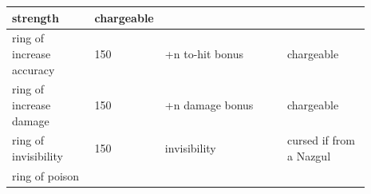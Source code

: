 \begin{longtable}{|>{\RaggedRight}p{0.23487\linewidth}|>{\RaggedRight}p{0.07372\linewidth}|>{\RaggedRight}p{0.34225\linewidth}|>{\RaggedRight}p{0.23487\linewidth}|}
strength\footnotemark[69]&\hspace*{0pt}\ignorespaces{}\hspace*{0pt}chargeable\\ \hline \hspace*{0pt}\ignorespaces{}\hspace*{0pt}ring of increase accuracy\footnotemark[70]&\hspace*{0pt}\ignorespaces{}\hspace*{0pt}150&\hspace*{0pt}\ignorespaces{}\hspace*{0pt}+n to-{}hit bonus&\hspace*{0pt}\ignorespaces{}\hspace*{0pt}chargeable\\ \hline \hspace*{0pt}\ignorespaces{}\hspace*{0pt}ring of increase damage\footnotemark[71]&\hspace*{0pt}\ignorespaces{}\hspace*{0pt}150&\hspace*{0pt}\ignorespaces{}\hspace*{0pt}+n damage bonus&\hspace*{0pt}\ignorespaces{}\hspace*{0pt}chargeable\\ \hline \hspace*{0pt}\ignorespaces{}\hspace*{0pt}ring of invisibility\footnotemark[72]&\hspace*{0pt}\ignorespaces{}\hspace*{0pt}150&\hspace*{0pt}\ignorespaces{}\hspace*{0pt}invisibility\footnotemark[73]&\hspace*{0pt}\ignorespaces{}\hspace*{0pt}cursed if from a Nazgul\footnotemark[74]\\ \hline \hspace*{0pt}\ignorespaces{}\hspace*{0pt}ring of poison 
\end{longtable}
